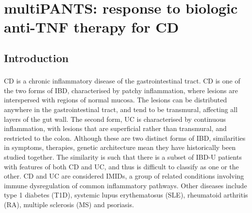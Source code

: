 %
%

\chapter{multiPANTS: response to biologic anti-TNF therapy for CD}


\begin{outline}

\section{Introduction}

\subsection{}

\1 CD is a chronic inflammatory disease of the gastrointestinal tract.
    \2 CD is one of the two forms of IBD, characterised by patchy inflammation, where lesions are interspersed with regions of normal mucosa. The lesions can be distributed anywhere in the gastrointestinal tract, and tend to be transmural, affecting all layers of the gut wall.
    \2 The second form, UC is characterised by continuous inflammation, with lesions that are superficial rather than transmural, and restricted to the colon. \autocite{roda2020CrohnDisease}
    \2 Although these are two distinct forms of IBD, similarities in symptoms, therapies, genetic architecture mean they have historically been studied together.
        \3 The similarity is such that there is a subset of IBD-U patients with features of both CD and UC, and thus is difficult to classify as one or the other.
    \2 CD and UC are considered IMIDs, a group of related conditions involving immune dysregulation of common inflammatory pathways.
        \3 Other diseases include type 1 diabetes (T1D), systemic lupus erythematosus (SLE), rheumatoid arthritis (RA), multiple sclerosis (MS) and psoriasis. \autocite{cotsapas2013ImmunemediatedDiseaseGenetics,david2018GeneticsImmunemediatedInflammatory}


\end{outline}
